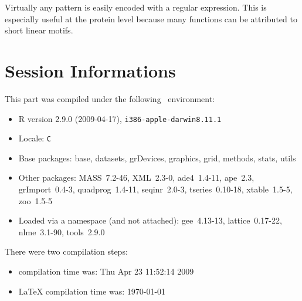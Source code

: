 \documentclass{article}
\begin{document}
Virtually any pattern is easily encoded with a regular expression. This is
especially useful at the protein level because many functions can be attributed 
to short linear motifs.


\section*{Session Informations}

\begin{scriptsize}

This part was compiled under the following \Rlogo{}~environment:

\begin{itemize}
  \item R version 2.9.0 (2009-04-17), \verb|i386-apple-darwin8.11.1|
  \item Locale: \verb|C|
  \item Base packages: base, datasets, grDevices, graphics, grid,
    methods, stats, utils
  \item Other packages: MASS~7.2-46, XML~2.3-0, ade4~1.4-11,
    ape~2.3, grImport~0.4-3, quadprog~1.4-11, seqinr~2.0-3,
    tseries~0.10-18, xtable~1.5-5, zoo~1.5-5
  \item Loaded via a namespace (and not attached): gee~4.13-13,
    lattice~0.17-22, nlme~3.1-90, tools~2.9.0
\end{itemize}
There were two compilation steps:

\begin{itemize}
  \item \Rlogo{} compilation time was: Thu Apr 23 11:52:14 2009
  \item \LaTeX{} compilation time was: \today
\end{itemize}

\end{scriptsize}


\clearpage
{}


\end{document}
